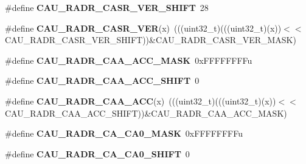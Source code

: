 \begin{DoxyCompactItemize}
\item 
\#define {\bfseries C\+A\+U\+\_\+\+R\+A\+D\+R\+\_\+\+C\+A\+S\+R\+\_\+\+V\+E\+R\+\_\+\+S\+H\+I\+FT}~28\hypertarget{group__CAU__Register__Masks_ga9b9d89d85aab94d1cf9066dcdc9f80b3}{}\label{group__CAU__Register__Masks_ga9b9d89d85aab94d1cf9066dcdc9f80b3}

\item 
\#define {\bfseries C\+A\+U\+\_\+\+R\+A\+D\+R\+\_\+\+C\+A\+S\+R\+\_\+\+V\+ER}(x)~(((uint32\+\_\+t)(((uint32\+\_\+t)(x))$<$$<$C\+A\+U\+\_\+\+R\+A\+D\+R\+\_\+\+C\+A\+S\+R\+\_\+\+V\+E\+R\+\_\+\+S\+H\+I\+FT))\&C\+A\+U\+\_\+\+R\+A\+D\+R\+\_\+\+C\+A\+S\+R\+\_\+\+V\+E\+R\+\_\+\+M\+A\+SK)\hypertarget{group__CAU__Register__Masks_gad6072b4fc13d1b80be7ce33a71da8b1f}{}\label{group__CAU__Register__Masks_gad6072b4fc13d1b80be7ce33a71da8b1f}

\item 
\#define {\bfseries C\+A\+U\+\_\+\+R\+A\+D\+R\+\_\+\+C\+A\+A\+\_\+\+A\+C\+C\+\_\+\+M\+A\+SK}~0x\+F\+F\+F\+F\+F\+F\+F\+Fu\hypertarget{group__CAU__Register__Masks_ga547665f9f7c6125733272bdba9d975f3}{}\label{group__CAU__Register__Masks_ga547665f9f7c6125733272bdba9d975f3}

\item 
\#define {\bfseries C\+A\+U\+\_\+\+R\+A\+D\+R\+\_\+\+C\+A\+A\+\_\+\+A\+C\+C\+\_\+\+S\+H\+I\+FT}~0\hypertarget{group__CAU__Register__Masks_gac2c98d65b03f99b601c30efaec5044f8}{}\label{group__CAU__Register__Masks_gac2c98d65b03f99b601c30efaec5044f8}

\item 
\#define {\bfseries C\+A\+U\+\_\+\+R\+A\+D\+R\+\_\+\+C\+A\+A\+\_\+\+A\+CC}(x)~(((uint32\+\_\+t)(((uint32\+\_\+t)(x))$<$$<$C\+A\+U\+\_\+\+R\+A\+D\+R\+\_\+\+C\+A\+A\+\_\+\+A\+C\+C\+\_\+\+S\+H\+I\+FT))\&C\+A\+U\+\_\+\+R\+A\+D\+R\+\_\+\+C\+A\+A\+\_\+\+A\+C\+C\+\_\+\+M\+A\+SK)\hypertarget{group__CAU__Register__Masks_ga4b76d84deca84761050fb5501b2e1f90}{}\label{group__CAU__Register__Masks_ga4b76d84deca84761050fb5501b2e1f90}

\item 
\#define {\bfseries C\+A\+U\+\_\+\+R\+A\+D\+R\+\_\+\+C\+A\+\_\+\+C\+A0\+\_\+\+M\+A\+SK}~0x\+F\+F\+F\+F\+F\+F\+F\+Fu\hypertarget{group__CAU__Register__Masks_ga8839d1ade5765c2f41d1e4666bb039ef}{}\label{group__CAU__Register__Masks_ga8839d1ade5765c2f41d1e4666bb039ef}

\item 
\#define {\bfseries C\+A\+U\+\_\+\+R\+A\+D\+R\+\_\+\+C\+A\+\_\+\+C\+A0\+\_\+\+S\+H\+I\+FT}~0\hypertarget{group__CAU__Register__Masks_ga56a6980d68ebf41b5b321ed2a9211c1e}{}\label{group__CAU__Register__Masks_ga56a6980d68ebf41b5b321ed2a9211c1e}


\end{DoxyCompactItemize}
